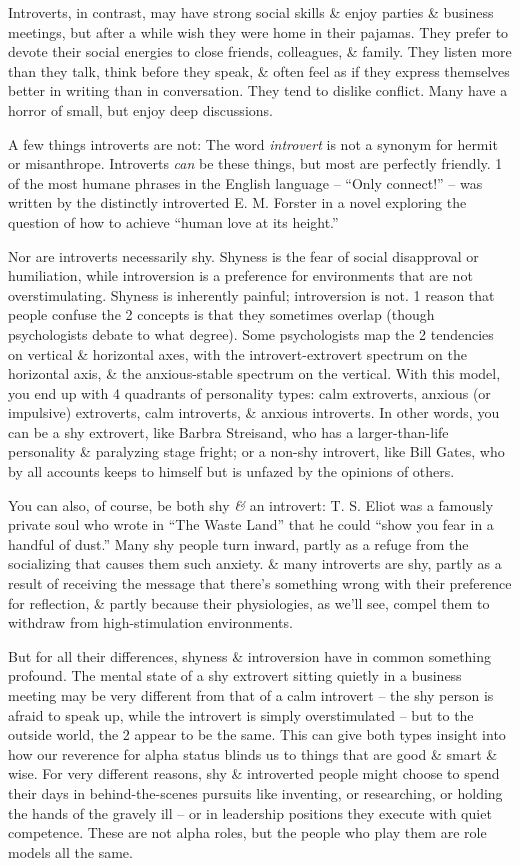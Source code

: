 \documentclass{article}
\numberwithin{equation}{section}
\begin{document}
Introverts, in contrast, may have strong social skills \& enjoy parties \& business meetings, but after a while wish they were home in their pajamas. They prefer to devote their social energies to close friends, colleagues, \& family. They listen more than they talk, think before they speak, \& often feel as if they express themselves better in writing than in conversation. They tend to dislike conflict. Many have a horror of small, but enjoy deep discussions.

A few things introverts are not: The word \textit{introvert} is not a synonym for hermit or misanthrope. Introverts \textit{can} be these things, but most are perfectly friendly. 1 of the most humane phrases in the English language -- ``Only connect!'' -- was written by the distinctly introverted E. M. Forster in a novel exploring the question of how to achieve ``human love at its height.''

Nor are introverts necessarily shy. Shyness is the fear of social disapproval or humiliation, while introversion is a preference for environments that are not overstimulating. Shyness is inherently painful; introversion is not. 1 reason that people confuse the 2 concepts is that they sometimes overlap (though psychologists debate to what degree). Some psychologists map the 2 tendencies on vertical \& horizontal axes, with the introvert-extrovert spectrum on the horizontal axis, \& the anxious-stable spectrum on the vertical. With this model, you end up with 4 quadrants of personality types: calm extroverts, anxious (or impulsive) extroverts, calm introverts, \& anxious introverts. In other words, you can be a shy extrovert, like Barbra Streisand, who has a larger-than-life personality \& paralyzing stage fright; or a non-shy introvert, like Bill Gates, who by all accounts keeps to himself but is unfazed by the opinions of others.

You can also, of course, be both shy \textit{\&} an introvert: T. S. Eliot was a famously private soul who wrote in ``The Waste Land'' that he could ``show you fear in a handful of dust.'' Many shy people turn inward, partly as a refuge from the socializing that causes them such anxiety. \& many introverts are shy, partly as a result of receiving the message that there's something wrong with their preference for reflection, \& partly because their physiologies, as we'll see, compel them to withdraw from high-stimulation environments.

But for all their differences, shyness \& introversion have in common something profound. The mental state of a shy extrovert sitting quietly in a business meeting may be very different from that of a calm introvert -- the shy person is afraid to speak up, while the introvert is simply overstimulated -- but to the outside world, the 2 appear to be the same. This can give both types insight into how our reverence for alpha status blinds us to things that are good \& smart \& wise. For very different reasons, shy \& introverted people might choose to spend their days in behind-the-scenes pursuits like inventing, or researching, or holding the hands of the gravely ill -- or in leadership positions they execute with quiet competence. These are not alpha roles, but the people who play them are role models all the same.
\end{document}
